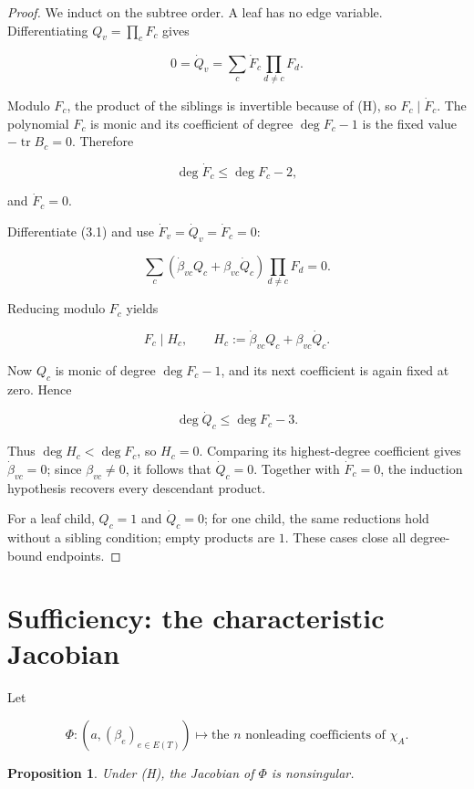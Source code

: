 \documentclass[11pt]{article}
\newtheorem{proposition}[theorem]{Proposition}
\theoremstyle{remark}
\begin{document}
\begin{proof}

We induct on the subtree order. A leaf has no edge variable. Differentiating $Q_v=\prod_cF_c$ gives

\[
0=\dot Q_v=
\sum_c\dot F_c\prod_{d\ne c}F_d.
\tag{5.2}
\]

Modulo $F_c$, the product of the siblings is invertible because of (H), so $F_c\mid\dot F_c$. The polynomial $F_c$ is monic and its coefficient of degree $\deg F_c-1$ is the fixed value $-\operatorname{tr}B_c=0$. Therefore

\[
\deg\dot F_c\le\deg F_c-2,
\]

and $\dot F_c=0$.

Differentiate (3.1) and use $\dot F_v=\dot Q_v=\dot F_c=0$:

\[
\sum_c
\left(\dot\beta_{vc}Q_c+\beta_{vc}\dot Q_c\right)
\prod_{d\ne c}F_d=0.
\tag{5.3}
\]

Reducing modulo $F_c$ yields

\[
F_c\mid H_c,
\qquad
H_c:=\dot\beta_{vc}Q_c+\beta_{vc}\dot Q_c.
\tag{5.4}
\]

Now $Q_c$ is monic of degree $\deg F_c-1$, and its next coefficient is again fixed at zero. Hence

\[
\deg\dot Q_c\le\deg F_c-3.
\]

Thus $\deg H_c<\deg F_c$, so $H_c=0$. Comparing its highest-degree coefficient gives $\dot\beta_{vc}=0$; since $\beta_{vc}\ne0$, it follows that $\dot Q_c=0$. Together with $\dot F_c=0$, the induction hypothesis recovers every descendant product.

For a leaf child, $Q_c=1$ and $\dot Q_c=0$; for one child, the same reductions hold without a sibling condition; empty products are $1$. These cases close all degree-bound endpoints.

\end{proof}

\section{Sufficiency: the characteristic Jacobian}


Let

\[
\Phi:(a,(\beta_e)_{e\in E(T)})
\longmapsto
\text{the }n\text{ nonleading coefficients of }\chi_A.
\tag{6.1}
\]

\begin{proposition}

Under (H), the Jacobian of $\Phi$ is nonsingular.

\end{proposition}
\end{document}
